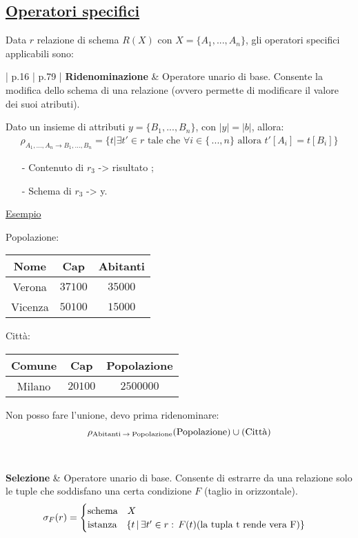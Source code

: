 \documentclass[a4paper, 10pt]{report}
\begin{document}
\subsection*{\underline{Operatori specifici}}
Data $r$ relazione di schema $R(X)$ con $X = \{A_1, ..., A_n\}$, gli operatori specifici applicabili sono:
\begin{longtable}{| p{} | p{} |}
\textbf{Ridenominazione} & Operatore unario di base. Consente la modifica dello schema di una relazione (ovvero permette di modificare il valore dei suoi atributi).

Dato un insieme di attributi $y = \{ B_1, ..., B_n\}$, con $|y| = |b|$, allora:
\begin{align*}
\rho_{A_1, ..., A_n \rightarrow B_1, ..., B_n} = \{t | \exists t' \in r \text{ tale che } \forall i \in \{\, ..., n\} \text{ allora } t'[A_i] = t[B_i]\}
\end{align*}

\begin{itemize}
\item[-] Contenuto di $r_3$ -> risultato ;
\item[-] Schema di $r_3$ -> y.
\end{itemize}

\underline{Esempio}

\begin{multicols}{2}
			Popolazione:
			
			\begin{tabular}{ccc}
				\toprule
				\textbf{Nome} & \textbf{Cap} & \textbf{Abitanti} \\
				\midrule
				Verona & $37100$ & $35000$  \\
				Vicenza & $50100$ & $15000$
			\end{tabular}
			
			\columnbreak
			
			Città:
			
			\begin{tabular}{ccc}
				\toprule
				\textbf{Comune} & \textbf{Cap} & \textbf{Popolazione} \\
				\midrule
				Milano & $20100$ & $2500000$
			\end{tabular}
		\end{multicols}
		
		Non posso fare l'unione, devo prima ridenominare:
		\[
			\rho_{\textup{Abitanti} \: \rightarrow \: \textup{Popolazione}}
			(\textup{Popolazione}) \cup (\textup{Città})
		\]
		\\\\
\textbf{Selezione} & Operatore unario di base. Consente di estrarre da una relazione solo le tuple che soddisfano una certa condizione $F$ (taglio in orizzontale).
\begin{align*}
				\sigma_{F}(r) = 
				\begin{cases}
					\textup{schema} \quad X \\
					\textup{istanza} \quad \{ t \, | \, \exists t' \in r : \, F(t) (\textup{la tupla t rende vera F})  \}
				\end{cases}
\end{align*}


\end{longtable}
\end{document}
